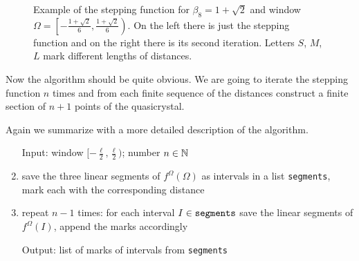 \documentclass[text.tex]{subfiles}
\begin{document}
\begin{figure}[h!]
\caption{Example of the stepping function for $\beta_8 = 1+\sqrt{2}$ and window $\Omega = \left[-\frac{1+\sqrt{2}}{6},\frac{1+\sqrt{2}}{6}\right)$. On the left there is just the stepping function and on the right there is its second iteration. Letters $S$, $M$, $L$ mark different lengths of distances. }%
\label{fig_steppingFunction}
\end{figure}

Now the algorithm should be quite obvious. We are going to iterate the stepping function $n$ times and from each finite sequence of the distances construct a finite section of $n+1$ points of the quasicrystal. 

Again we summarize with a more detailed description of the algorithm.

\begin{enumerate}
\item[Input:] window $[-\frac{\ell}{2},\frac{\ell}{2})$; number $n\in\mathbb{N}$
\item save the three linear segments of $f^\Omega(\Omega)$ as intervals in a list \texttt{segments}, mark each with the corresponding distance
\item repeat $n-1$ times: for each interval $I\in\text{\texttt{segments}}$ save the linear segments of $f^\Omega(I)$, append the marks accordingly
\item[Output:] list of marks of intervals from \texttt{segments}
\end{enumerate}
\end{document}
